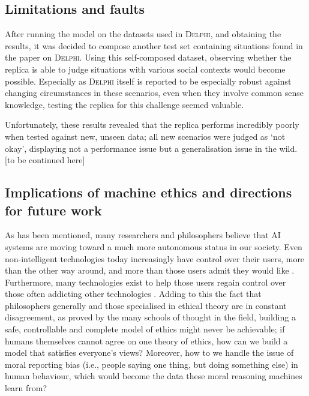 \documentclass[final]{clv3} %
\begin{document}
\subsection{Limitations and faults}

After running the model on the datasets used in \textsc{Delphi}, and obtaining the results, it was decided to compose another test set containing situations found in the paper on \textsc{Delphi}. Using this self-composed dataset, observing whether the replica is able to judge situations with various social contexts would become possible. Especially as \textsc{Delphi} itself is reported to be especially robust against changing circumstances in these scenarios, even when they involve common sense knowledge, testing the replica for this challenge seemed valuable.

Unfortunately, these results revealed that the replica performs incredibly poorly when tested against new, unseen data; all new scenarios were judged as ‘not okay’, displaying not a performance issue but a generalisation issue in the wild. [to be continued here] \\

\subsection{Implications of machine ethics and directions for future work
}

As has been mentioned, many researchers and philosophers believe \cite{allen2005, tegmark} that AI systems are moving toward a much more autonomous status in our society. Even non-intelligent technologies today increasingly have control over their users, more than the other way around, and more than those users admit they would like \cite{ryan}. Furthermore, many technologies exist to help those users regain control over those often addicting other technologies \cite{winkelman}. Adding to this the fact that philosophers generally and those specialised in ethical theory are in constant disagreement, as proved by the many schools of thought in the field, building a safe, controllable and complete model of ethics might never be achievable; if humans themselves cannot agree on one theory of ethics, how can we build a model that satisfies everyone’s views? Moreover, how to we handle the issue of moral reporting bias (i.e., people saying one thing, but doing something else) in human behaviour, which would become the data these moral reasoning machines learn from?\\
\end{document}
